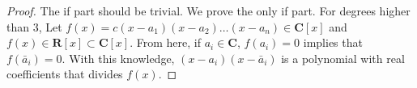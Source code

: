 \vspace{2ex}
\begin{proof}
The if part should be trivial. We prove the only if part. For degrees higher than 3, Let $f(x)=c(x-a_1)(x-a_2)\ldots (x-a_{n})\in {\bm C}[x]$ and $f(x)\in{\bm R}[x]\subset {\bm C}[x]$. From here, if $a_{i}\in {\bm C}$, $f(a_{i})=0$ implies that $f(\bar{a}_{i})=0$. With this knowledge, $(x-a_{i})(x-\bar{a}_{i})$ is a polynomial with real coefficients that divides $f(x)$.
\end{proof}
\vspace{2ex}


